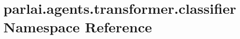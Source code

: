 \hypertarget{namespaceparlai_1_1agents_1_1transformer_1_1classifier}{}\section{parlai.\+agents.\+transformer.\+classifier Namespace Reference}
\label{namespaceparlai_1_1agents_1_1transformer_1_1classifier}
